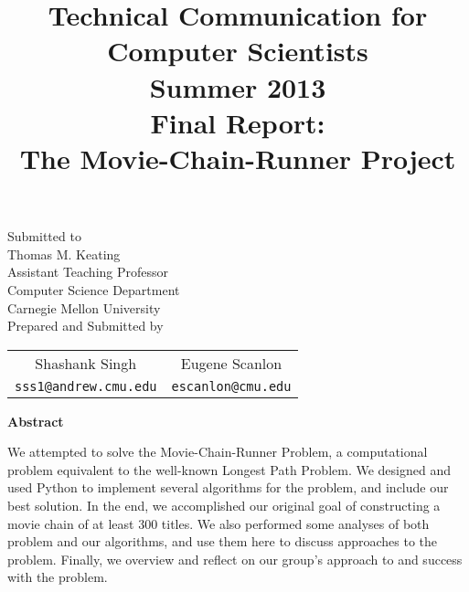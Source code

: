 \documentclass[11pt,english]{article}
\title{
{\normalsize \bf Technical Communication for Computer Scientists\\
Summer 2013}\\
\vspace{2cm}
{\bf Final Report:\\The Movie-Chain-Runner Project}}
\author{
}
\begin{document}
\begin{titlepage}
\maketitle
\vfill
\begin{center}
Submitted to\\
Thomas M. Keating\\
Assistant Teaching Professor\\
Computer Science Department\\
Carnegie Mellon University\\
\vspace{1cm}
Prepared and Submitted by\\
\vspace{0.5cm}

\begin{tabular}{cc}
Shashank Singh \hspace{2cm} & Eugene Scanlon \\
\texttt{sss1@andrew.cmu.edu} \hspace{2cm} & \texttt{escanlon@cmu.edu}
\end{tabular}

\vspace{2cm}
{\bf Abstract}\\
\end{center}
We attempted to solve the Movie-Chain-Runner Problem, a computational problem
equivalent to the well-known Longest Path Problem. We designed and used Python
to implement several algorithms for the problem, and include our best solution.
In the end, we accomplished our original goal of constructing a movie chain of
at least 300 titles. We also performed some analyses of both problem and our
algorithms, and use them here to discuss approaches to the problem. Finally, we
overview and reflect on our group's approach to and success with the problem.

\end{titlepage}
\end{document}
